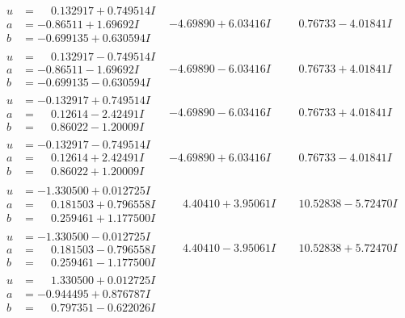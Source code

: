 \documentclass[1p]{elsarticle_modified}
\theoremstyle{definition}
\begin{document}
$$\begin{array}{c|c|c}
\begin{aligned}
u &= \phantom{-}0.132917 + 0.749514 I \\
a &= -0.86511 + 1.69692 I \\
b &= -0.699135 + 0.630594 I\end{aligned}
 & -4.69890 + 6.03416 I & \phantom{-}0.76733 - 4.01841 I \\ \hline\begin{aligned}
u &= \phantom{-}0.132917 - 0.749514 I \\
a &= -0.86511 - 1.69692 I \\
b &= -0.699135 - 0.630594 I\end{aligned}
 & -4.69890 - 6.03416 I & \phantom{-}0.76733 + 4.01841 I \\ \hline\begin{aligned}
u &= -0.132917 + 0.749514 I \\
a &= \phantom{-}0.12614 - 2.42491 I \\
b &= \phantom{-}0.86022 - 1.20009 I\end{aligned}
 & -4.69890 - 6.03416 I & \phantom{-}0.76733 + 4.01841 I \\ \hline\begin{aligned}
u &= -0.132917 - 0.749514 I \\
a &= \phantom{-}0.12614 + 2.42491 I \\
b &= \phantom{-}0.86022 + 1.20009 I\end{aligned}
 & -4.69890 + 6.03416 I & \phantom{-}0.76733 - 4.01841 I \\ \hline\begin{aligned}
u &= -1.330500 + 0.012725 I \\
a &= \phantom{-}0.181503 + 0.796558 I \\
b &= \phantom{-}0.259461 + 1.177500 I\end{aligned}
 & \phantom{-}4.40410 + 3.95061 I & \phantom{-}10.52838 - 5.72470 I \\ \hline\begin{aligned}
u &= -1.330500 - 0.012725 I \\
a &= \phantom{-}0.181503 - 0.796558 I \\
b &= \phantom{-}0.259461 - 1.177500 I\end{aligned}
 & \phantom{-}4.40410 - 3.95061 I & \phantom{-}10.52838 + 5.72470 I \\ \hline\begin{aligned}
u &= \phantom{-}1.330500 + 0.012725 I \\
a &= -0.944495 + 0.876787 I \\
b &= \phantom{-}0.797351 - 0.622026 I\end{aligned}

\end{array}$$
\end{document}
